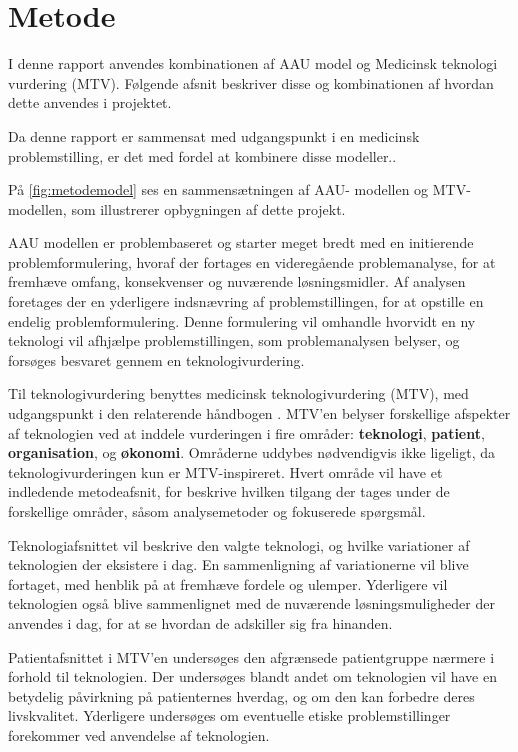 \chapter{Metode} \label{metode}
I denne rapport anvendes kombinationen af AAU model og Medicinsk teknologi vurdering (MTV). Følgende afsnit beskriver disse og kombinationen af hvordan dette anvendes i projektet. 

Da denne rapport er sammensat med udgangspunkt i en medicinsk problemstilling, er det med fordel at kombinere disse modeller..

På \ref{fig:metodemodel} ses en sammensætningen af AAU- modellen og MTV-modellen, som illustrerer opbygningen af dette projekt.

AAU modellen er problembaseret og starter meget bredt med en initierende problemformulering, hvoraf der fortages en videregående problemanalyse, for at fremhæve omfang, konsekvenser og nuværende løsningsmidler. 
Af analysen foretages der en yderligere indsnævring af problemstillingen, for at opstille en endelig problemformulering. Denne formulering vil omhandle hvorvidt en ny teknologi vil afhjælpe problemstillingen, som problemanalysen belyser, og forsøges besvaret gennem en teknologivurdering. 



Til teknologivurdering benyttes medicinsk teknologivurdering (MTV), med udgangspunkt i den relaterende håndbogen \citep{mtvhaandbog}. 
MTV'en belyser forskellige afspekter af teknologien ved at inddele vurderingen i fire områder: \textbf{teknologi}, \textbf{patient}, \textbf{organisation}, og \textbf{økonomi}. Områderne uddybes nødvendigvis ikke ligeligt, da teknologivurderingen kun er MTV-inspireret. 
Hvert område vil have et indledende metodeafsnit, for beskrive hvilken tilgang der tages under de forskellige områder, såsom analysemetoder og fokuserede spørgsmål. 

Teknologiafsnittet vil beskrive den valgte teknologi, og hvilke variationer af teknologien der eksistere i dag. En sammenligning af variationerne vil blive fortaget, med henblik på at fremhæve fordele og ulemper. Yderligere vil teknologien også blive sammenlignet med de nuværende løsningsmuligheder der anvendes i dag, for at se hvordan de adskiller sig fra hinanden.  

Patientafsnittet i MTV’en undersøges den afgrænsede patientgruppe nærmere i forhold til teknologien. Der undersøges blandt andet om teknologien vil have en betydelig påvirkning på patienternes hverdag, og om den kan forbedre deres livskvalitet. Yderligere undersøges om eventuelle etiske problemstillinger forekommer ved anvendelse af teknologien.

